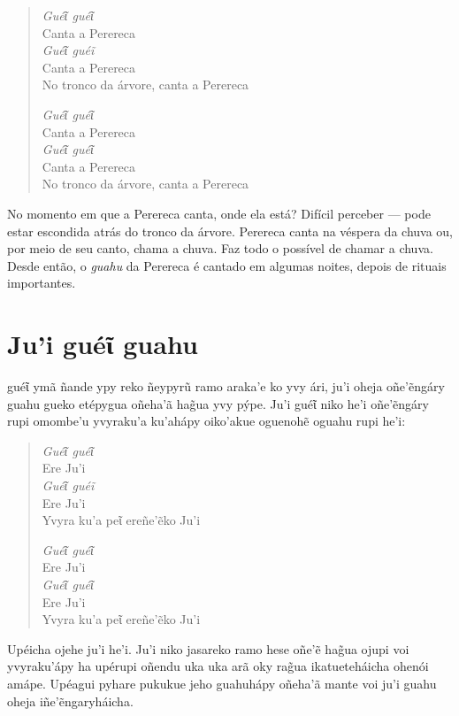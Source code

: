 \begin{verse}
\textit{Guéῖ guéῖ}\\
Canta a Perereca\\
\textit{Guéῖ guéĩ}\\
Canta a Perereca\\
No tronco da árvore, canta a Perereca

\textit{Guéῖ guéῖ}\\
Canta a Perereca\\
\textit{Guéῖ guéῖ}\\
Canta a Perereca\\
No tronco da árvore, canta a Perereca
\end{verse}

No momento em que a Perereca canta, onde ela está? Difícil perceber ---
pode estar escondida atrás do tronco da árvore. Perereca canta na
véspera da chuva ou, por meio de seu canto, chama a chuva. Faz todo o
possível de chamar a chuva. Desde então, o \textit{guahu} da Perereca é
cantado em algumas noites, depois de rituais importantes.

\chapter{Ju'i guéῖ guahu}

 guéῖ ymã ñande ypy reko ñeypyrũ ramo araka'e ko yvy ári, ju'i oheja
oñe'ẽngáry guahu gueko etépygua oñeha'ã hag̃ua yvy pýpe. Ju'i guéῖ niko
he'i oñe'ẽngáry rupi omombe'u yvyraku'a ku'ahápy oiko'akue oguenohẽ
oguahu rupi he'i:


\begin{verse}
\textit{Guéῖ guéῖ}\\
Ere Ju'i\\
\textit{Guéῖ guéĩ}\\
Ere Ju'i\\
Yvyra ku'a peῖ ereñe'ẽko Ju'i
        
\textit{Guéῖ guéῖ}\\ 
Ere Ju'i\\
\textit{Guéῖ guéῖ}\\
Ere Ju'i\\
Yvyra ku'a peῖ ereñe'ẽko Ju'i 
\end{verse}

Upéicha ojehe ju'i he'i. Ju'i niko jasareko ramo hese oñe'ẽ hag̃ua ojupi
voi yvyraku'ápy ha upérupi oñendu uka uka arã oky rag̃ua ikatueteháicha
ohenói amápe. Upéagui pyhare pukukue jeho guahuhápy oñeha'ã mante voi
ju'i guahu oheja iñe'ẽngaryháicha.

